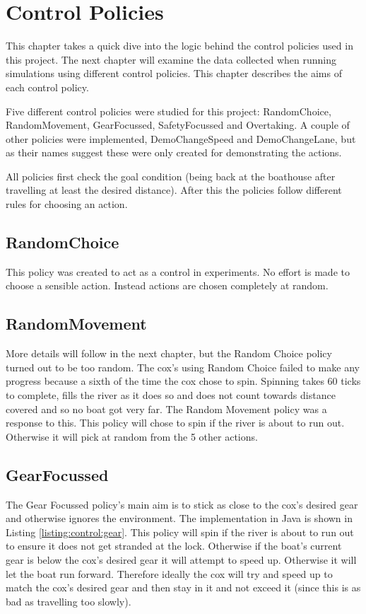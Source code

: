 \chapter{Control Policies}\label{chapter:control_policy}

This chapter takes a quick dive into the logic behind the control policies used in this project. The next chapter will examine the data collected when running simulations using different control policies. This chapter describes the aims of each control policy.

Five different control policies were studied for this project: RandomChoice, RandomMovement, GearFocussed, SafetyFocussed and Overtaking. A couple of other policies were implemented, DemoChangeSpeed and DemoChangeLane, but as their names suggest these were only created for demonstrating the actions.

All policies first check the goal condition (being back at the boathouse after travelling at least the desired distance). After this the policies follow different rules for choosing an action.

\section{RandomChoice}
This policy was created to act as a control in experiments. No effort is made to choose a sensible action. Instead actions are chosen completely at random.

\section{RandomMovement}

More details will follow in the next chapter, but the Random Choice policy turned out to be too random. The cox's using Random Choice failed to make any progress because a sixth of the time the cox chose to spin. Spinning takes 60 ticks to complete, fills the river as it does so and does not count towards distance covered and so no boat got very far. The Random Movement policy was a response to this. This policy will chose to spin if the river is about to run out. Otherwise it will pick at random from the 5 other actions.

\section{GearFocussed}

The Gear Focussed policy's main aim is to stick as close to the cox's desired gear and otherwise ignores the environment. The implementation in Java is shown in Listing \ref{listing:control:gear}. This policy will spin if the river is about to run out to ensure it does not get stranded at the lock. Otherwise if the boat's current gear is below the cox's desired gear it will attempt to speed up. Otherwise it will let the boat run forward. Therefore ideally the cox will try and speed up to match the cox's desired gear and then stay in it and not exceed it (since this is as bad as travelling too slowly).

